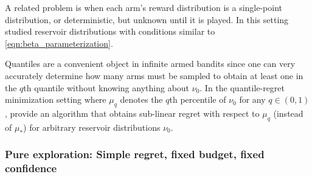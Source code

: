 A related problem is when each arm's reward distribution is a single-point distribution, or deterministic, but unknown until it is played.
In this setting \cite{david2014infinitely,david2015refined} studied reservoir distributions with conditions similar to \eqref{eqn:beta_parameterization}.

Quantiles are a convenient object in infinite armed bandits since one can very accurately determine how many arms must be sampled to obtain at least one in the $q$th quantile without knowing anything about $\nu_0$. 
In the quantile-regret minimization setting where $\mu_q$ denotes the $q$th percentile of $\nu_0$ for any $q \in (0,1)$, \cite{chaudhuriquantile} provide an algorithm that obtains sub-linear regret with respect to $\mu_q$ (instead of $\mu_*$) for arbitrary reservoir distributions $\nu_0$.

\subsubsection{Pure exploration: Simple regret, fixed budget, fixed confidence}


